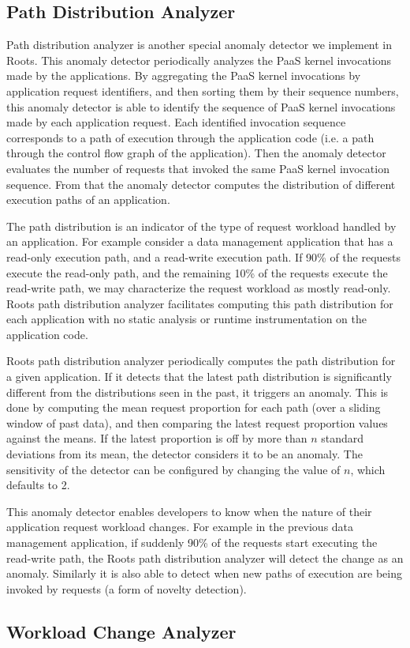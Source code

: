 \subsection{Path Distribution Analyzer}
Path distribution analyzer is another special anomaly detector we implement in Roots. This
anomaly detector periodically analyzes the PaaS kernel invocations made by the applications.
By aggregating the PaaS kernel invocations by application request identifiers, and then sorting them by
their sequence numbers, this anomaly detector is able to identify the sequence of
PaaS kernel invocations made by each application request. 
Each identified invocation sequence corresponds to a path of
execution through the application code (i.e. a path through the control flow graph of the application). 
Then the anomaly detector evaluates the number of requests
that invoked the same PaaS kernel invocation sequence. From that the anomaly detector
computes the distribution of different execution paths of an application.

The path distribution is an indicator of the type of request workload handled by an application.
For example consider a data management application that has a read-only execution path, and a read-write 
execution path. If 90\% of the requests execute the read-only path, and the remaining 10\% of the requests
execute the read-write path, we may characterize the request workload as mostly read-only. 
Roots path distribution analyzer facilitates computing this path distribution for each application
with no static analysis or runtime instrumentation on the application code.

Roots path distribution analyzer periodically computes the path distribution for a given application.
If it detects that the latest path distribution is significantly different from the distributions seen in the 
past, it triggers an anomaly. This is done by computing the mean request proportion for each path
(over a sliding window of past data),
and then comparing the latest request proportion values against the means. If the latest proportion
is off by more than $n$ standard deviations from its mean, the detector considers it to be an
anomaly. The sensitivity of the detector can be configured by changing the value of $n$, which
defaults to 2. 

This anomaly detector enables developers to know when the nature of their application request
workload changes. For example in the previous data management application, if suddenly 90\%
of the requests start executing the read-write path, the Roots path distribution analyzer will
detect the change as an anomaly. Similarly it is also able to detect when new paths of execution
are being invoked by requests (a form of novelty detection).

\subsection{Workload Change Analyzer}